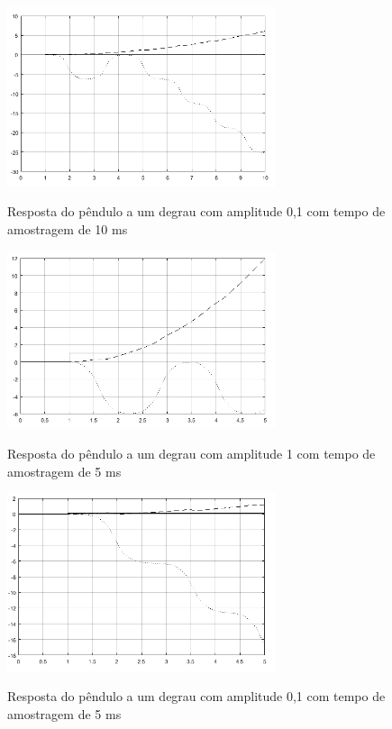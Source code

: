 \begin{figure}[!htb]
    \centering
    \caption{Resposta do pêndulo a um degrau com amplitude 0,1 com tempo de amostragem de 10 ms}
    \includegraphics[width=0.7\textwidth]{./04-figuras/pendulum_matlab_step_diagram_geral_step0_1}
    \label{fig:pendulum_matlab_step_diagram_geral_step0_1}
\end{figure}

\begin{figure}[!htb]
    \centering
    \caption{Resposta do pêndulo a um degrau com amplitude 1 com tempo de amostragem de 5 ms}
    \includegraphics[width=0.7\textwidth]{./04-figuras/pendulum_matlab_step_diagram_geral_step1_5s}
    \label{fig:pendulum_matlab_step_diagram_geral_step1_5s}
\end{figure}

\begin{figure}[!htb]
    \centering
    \caption{Resposta do pêndulo a um degrau com amplitude 0,1 com tempo de amostragem de 5 ms}
    \includegraphics[width=0.7\textwidth]{./04-figuras/pendulum_matlab_step_diagram_geral_step0_1_5s}
    \label{fig:pendulum_matlab_step_diagram_geral_step0_1_5s}
\end{figure}

